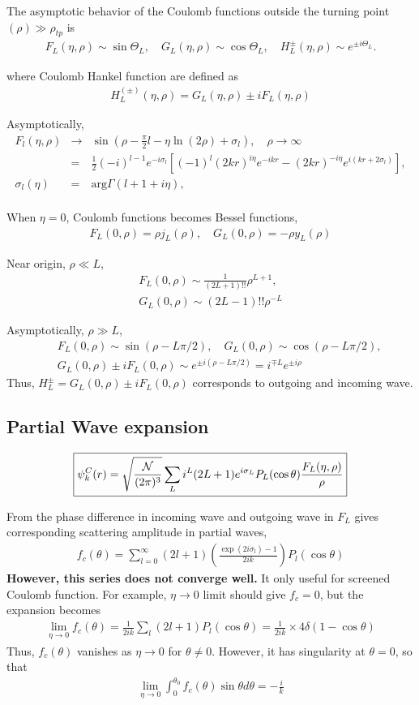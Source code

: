 \documentclass[10pt]{book}
\newcommand{\bea}{\begin{eqnarray}}
\newcommand{\eea}{\end{eqnarray}}
\newcommand{\no}{\nonumber \\}
\begin{document}
The asymptotic behavior of the Coulomb functions 
outside the turning point $(\rho)\gg \rho_{tp}$ is
\bea
F_L(\eta,\rho)\sim \sin\Theta_L,\quad
G_L(\eta,\rho)\sim \cos\Theta_L,\quad
H_L^{\pm}(\eta,\rho)\sim e^{\pm i\Theta_L}.
\eea

where Coulomb Hankel function are defined as
\bea 
H^{(\pm)}_L(\eta,\rho)=G_L(\eta,\rho)\pm i F_L(\eta,\rho) 
\eea 

Asymptotically,
\bea
F_l(\eta,\rho)&\to&
  \sin(\rho-\frac{\pi}{2}l-\eta\ln(2\rho)+\sigma_l),
  \quad {\rho\to \infty}\no
    &=&\frac{1}{2}(-i)^{l-1} e^{-i\sigma_l}
    [(-1)^l(2kr)^{i\eta}e^{-ikr}
    -(2kr)^{-i\eta} e^{i(kr+2\sigma_l)}
    ],\no
  \sigma_l(\eta)&=&\mbox{arg} \Gamma(l+1+i\eta),\no
\eea

When $\eta=0$, Coulomb functions becomes Bessel functions,
\bea
F_L(0,\rho)=\rho j_L(\rho),
\quad G_L(0,\rho)=-\rho y_L(\rho)
\eea

Near origin, $\rho\ll L$,
\bea
F_L(0,\rho)\sim \frac{1}{(2L+1)!!} \rho^{L+1},\no
G_L(0,\rho)\sim (2L-1)!! \rho^{-L}
\eea

Asymptotically, $\rho\gg L$,
\bea
& &F_L(0,\rho)\sim \sin(\rho-L\pi/2),\quad
G_L(0,\rho)\sim \cos(\rho-L\pi/2),\no
& & G_L(0,\rho)\pm i F_L(0,\rho)
 \sim e^{\pm i(\rho-L\pi/2)}= i^{\mp L} e^{\pm i\rho}
\eea
Thus, $H_L^{\pm}=G_L(0,\rho)\pm i F_L(0,\rho)$ corresponds to 
outgoing and incoming wave.

\subsection{Partial Wave expansion}
\bea
\boxed{  
\psi_k^C(r)=\sqrt{\frac{\cal N}{(2\pi)^3}}
     \sum_L i^L (2L+1) e^{i\sigma_L} P_L(\cos\theta)
              \frac{F_L(\eta,\rho)}{\rho} }
\eea 

From the phase difference in incoming wave and outgoing wave 
in $F_L$ gives
corresponding scattering amplitude in partial waves,
\bea
\boxed{ 
f_c(\theta)
=\sum_{l=0}^\infty (2l+1)
 \left(\frac{\exp(2i\sigma_l)-1}{2ik}\right)P_l(\cos\theta)
 }
\eea
{\bf However, this series does not converge well.} It only useful for screened Coulomb function. 
For example, $\eta\to 0$ limit should give $f_c=0$, but the expansion becomes
\bea 
\lim_{\eta\to 0}f_c(\theta)=\frac{1}{2ik}\sum_{l} (2l+1)P_l(\cos\theta)=\frac{1}{2ik}\times 4\delta(1-\cos\theta)
\eea 
Thus, $f_c(\theta)$ vanishes as $\eta\to 0$ for $\theta\neq 0$. 
However, it has singularity at $\theta=0$, so that
\bea
\lim_{\eta\to 0}\int_0^{\theta_0} f_c(\theta)\sin\theta d\theta=-\frac{i}{k}
\eea 
\end{document}
